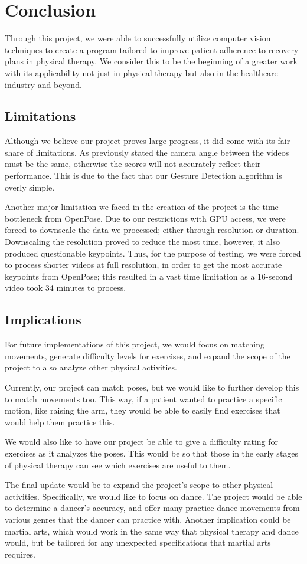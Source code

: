 \section{Conclusion}
\label{sec:conclusion}

\indent Through this project, we were able to successfully utilize computer vision 
techniques to create a program tailored to improve patient adherence to 
recovery plans in physical therapy. We consider this to be the beginning 
of a greater work with its applicability not just in physical therapy 
but also in the healthcare industry and beyond.

\subsection{Limitations}
\indent Although we believe our project proves large progress, it did 
come with its fair share of limitations. As previously stated the camera 
angle between the videos must be the same, otherwise the scores will not 
accurately reflect their performance. This is due to the fact that our 
Gesture Detection algorithm is overly simple. 

\indent Another major limitation we faced in the creation of the project 
is the time bottleneck from OpenPose. Due to our restrictions with GPU 
access, we were forced to downscale the data we processed; either 
through resolution or duration. Downscaling the resolution proved to 
reduce the most time, however, it also produced questionable keypoints. 
Thus, for the purpose of testing, we were forced to process shorter 
videos at full resolution, in order to get the most accurate keypoints 
from OpenPose; this resulted in a vast time limitation as a 16-second 
video took 34 minutes to process.

\subsection{Implications}
\indent For future implementations of this project, we would focus on 
matching movements, generate difficulty levels for exercises, and expand 
the scope of the project to also analyze other physical activities. 

\indent Currently, our project can match poses, but we would like 
to further develop this to match movements too. This way, if a patient 
wanted to practice a specific motion, like raising the arm, they would 
be able to easily find exercises that would help them practice this. 

\indent We would also like to have our project be able to give a 
difficulty rating for exercises as it analyzes the poses. This would be 
so that those in the early stages of physical therapy can see which 
exercises are useful to them. 

\indent The final update would be to expand the project’s scope to 
other physical activities. Specifically, we would like to focus on 
dance. The project would be able to determine a dancer’s accuracy, and 
offer many practice dance movements from various genres that the 
dancer can practice with. Another implication could be martial arts, 
which would work in the same way that physical therapy and dance would, 
but be tailored for any unexpected specifications that martial arts 
requires. 
